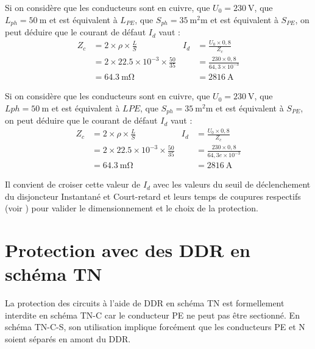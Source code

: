 \begin{exemple}
Si on considère que les conducteurs sont en cuivre, que $U_{0}=\SI{230}{\volt}$, que $L_{ph}=\SI{50}{\meter}$ et est équivalent à $L_{PE}$, que $S_{ph}=\SI{35}{\square\milli\meter}$ et est équivalent à  $S_{PE}$, on peut déduire que le courant de défaut $I_d$ vaut :
\begin{align*}
		Z_{c}	&= 2 \times \rho \times \frac{L}{S}  								& 			I_d		&= \frac{U_0 \times 0,8}{Z_c} \\
					&= 2 \times 22.5 \times 10^{-3} \times \frac{50}{35} 	&						&= \frac{230 \times 0,8}{64,3 \times 10^{-3}} \\
					&= \SI{64,3}{\milli\ohm}						 						& 						&= \SI{2816}{\ampere}
\end{align*}
\end{exemple}

\begin{exemple}
Si on considère que les conducteurs sont en cuivre, que $U_{0}=\SI{230}{\volt}$, que $L{ph}=\SI{50}{\meter}$ et est équivalent à $L{PE}$, que $S_{ph}=\SI{35}{\square\milli\meter}$ et est équivalent à  $S_{PE}$, on peut déduire que le courant de défaut $I_d$ vaut :
\begin{align*}
		Z_{c}	&= 2 \times \rho \times \frac{L}{S}  								& 			I_d		&= \frac{U_0 \times 0,8}{Z_c} \\
					&= 2 \times 22.5 \times 10^{-3} \times \frac{50}{35} 			&				&= \frac{230 \times 0,8}{64,3e \times 10^{-3}} \\
					&= \SI{64,3}{\milli\ohm}						 						& 						&= \SI{2816}{\ampere}
\end{align*}

Il convient de croiser cette valeur de $I_d$ avec les valeurs du seuil de déclenchement du disjoncteur Instantané et Court-retard et leurs temps de coupures respectifs (voir ) pour valider le dimensionnement et le choix de la protection.

\end{exemple}

\section{Protection avec des DDR en schéma TN}

La protection des circuits à l'aide de DDR en schéma TN est formellement interdite en schéma TN-C car le conducteur PE ne peut pas être sectionné. En schéma TN-C-S, son utilisation implique forcément que les conducteurs PE et N soient séparés en amont du DDR.\\

